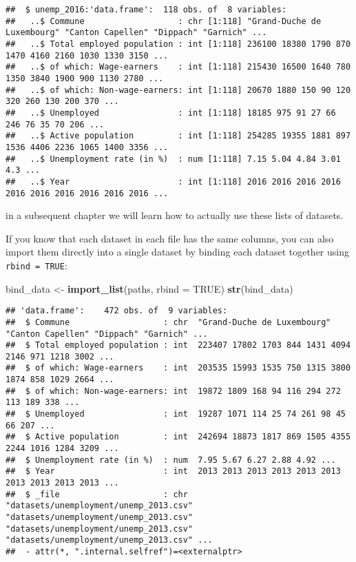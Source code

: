 \documentclass[
]{article}
\newenvironment{Shaded}{\begin{snugshade}}{\end{snugshade}}
\newcommand{\DataTypeTok}[1]{\textcolor[rgb]{0.13,0.29,0.53}{#1}}
\newcommand{\KeywordTok}[1]{\textcolor[rgb]{0.13,0.29,0.53}{\textbf{#1}}}
\newcommand{\NormalTok}[1]{#1}
\newcommand{\OtherTok}[1]{\textcolor[rgb]{0.56,0.35,0.01}{#1}}
\newcommand{\StringTok}[1]{\textcolor[rgb]{0.31,0.60,0.02}{#1}}
\begin{document}
\begin{verbatim}
##  $ unemp_2016:'data.frame':  118 obs. of  8 variables:
##   ..$ Commune                   : chr [1:118] "Grand-Duche de Luxembourg" "Canton Capellen" "Dippach" "Garnich" ...
##   ..$ Total employed population : int [1:118] 236100 18380 1790 870 1470 4160 2160 1030 1330 3150 ...
##   ..$ of which: Wage-earners    : int [1:118] 215430 16500 1640 780 1350 3840 1900 900 1130 2780 ...
##   ..$ of which: Non-wage-earners: int [1:118] 20670 1880 150 90 120 320 260 130 200 370 ...
##   ..$ Unemployed                : int [1:118] 18185 975 91 27 66 246 76 35 70 206 ...
##   ..$ Active population         : int [1:118] 254285 19355 1881 897 1536 4406 2236 1065 1400 3356 ...
##   ..$ Unemployment rate (in %)  : num [1:118] 7.15 5.04 4.84 3.01 4.3 ...
##   ..$ Year                      : int [1:118] 2016 2016 2016 2016 2016 2016 2016 2016 2016 2016 ...
\end{verbatim}

in a subsequent chapter we will learn how to actually use these lists of datasets.

If you know that each dataset in each file has the same columns, you can also import them directly
into a single dataset by binding each dataset together using \texttt{rbind\ =\ TRUE}:

\begin{Shaded}
\begin{Highlighting}[]
\NormalTok{bind\_data \textless{}{-}}\StringTok{ }\KeywordTok{import\_list}\NormalTok{(paths, }\DataTypeTok{rbind =} \OtherTok{TRUE}\NormalTok{)}
\KeywordTok{str}\NormalTok{(bind\_data)}
\end{Highlighting}
\end{Shaded}

\begin{verbatim}
## 'data.frame':    472 obs. of  9 variables:
##  $ Commune                   : chr  "Grand-Duche de Luxembourg" "Canton Capellen" "Dippach" "Garnich" ...
##  $ Total employed population : int  223407 17802 1703 844 1431 4094 2146 971 1218 3002 ...
##  $ of which: Wage-earners    : int  203535 15993 1535 750 1315 3800 1874 858 1029 2664 ...
##  $ of which: Non-wage-earners: int  19872 1809 168 94 116 294 272 113 189 338 ...
##  $ Unemployed                : int  19287 1071 114 25 74 261 98 45 66 207 ...
##  $ Active population         : int  242694 18873 1817 869 1505 4355 2244 1016 1284 3209 ...
##  $ Unemployment rate (in %)  : num  7.95 5.67 6.27 2.88 4.92 ...
##  $ Year                      : int  2013 2013 2013 2013 2013 2013 2013 2013 2013 2013 ...
##  $ _file                     : chr  "datasets/unemployment/unemp_2013.csv" "datasets/unemployment/unemp_2013.csv" "datasets/unemployment/unemp_2013.csv" "datasets/unemployment/unemp_2013.csv" ...
##  - attr(*, ".internal.selfref")=<externalptr>
\end{verbatim}
\end{document}
